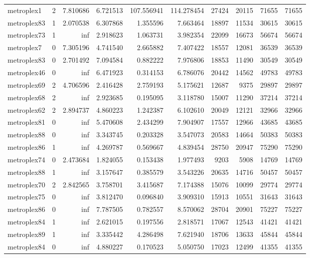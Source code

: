 \begin{longtable}{|l|r|r|r|r|r|r|r|r|r|}
metroplex1 & 2 & 7.810686 & 6.721513 & 107.556941 & 114.278454 & 27424 & 20115 & 71655 & 71655 \\
metroplex83 & 1 & 2.070538 & 6.307868 & 1.355596 & 7.663464 & 18897 & 11534 & 30615 & 30615 \\
metroplex73 & 1 & inf & 2.918623 & 1.063731 & 3.982354 & 22099 & 16673 & 56674 & 56674 \\
metroplex7 & 0 & 7.305196 & 4.741540 & 2.665882 & 7.407422 & 18557 & 12081 & 36539 & 36539 \\
metroplex83 & 0 & 2.701492 & 7.094584 & 0.882222 & 7.976806 & 18853 & 11490 & 30549 & 30549 \\
metroplex46 & 0 & inf & 6.471923 & 0.314153 & 6.786076 & 20442 & 14562 & 49783 & 49783 \\
metroplex69 & 2 & 4.706596 & 2.416428 & 2.759193 & 5.175621 & 12687 & 9375 & 29897 & 29897 \\
metroplex68 & 2 & inf & 2.923685 & 0.195095 & 3.118780 & 15007 & 11290 & 37214 & 37214 \\
metroplex62 & 2 & 2.894737 & 4.860223 & 1.242387 & 6.102610 & 20049 & 12121 & 32966 & 32966 \\
metroplex81 & 0 & inf & 5.470608 & 2.434299 & 7.904907 & 17557 & 12966 & 43685 & 43685 \\
metroplex88 & 0 & inf & 3.343745 & 0.203328 & 3.547073 & 20583 & 14664 & 50383 & 50383 \\
metroplex86 & 1 & inf & 4.269787 & 0.569667 & 4.839454 & 28750 & 20947 & 75290 & 75290 \\
metroplex74 & 0 & 2.473684 & 1.824055 & 0.153438 & 1.977493 & 9203 & 5908 & 14769 & 14769 \\
metroplex88 & 1 & inf & 3.157647 & 0.385579 & 3.543226 & 20635 & 14716 & 50457 & 50457 \\
metroplex70 & 2 & 2.842565 & 3.758701 & 3.415687 & 7.174388 & 15076 & 10099 & 29774 & 29774 \\
metroplex75 & 0 & inf & 3.812470 & 0.096840 & 3.909310 & 15913 & 10551 & 31643 & 31643 \\
metroplex86 & 0 & inf & 7.787505 & 0.782557 & 8.570062 & 28704 & 20901 & 75227 & 75227 \\
metroplex84 & 1 & inf & 2.621015 & 0.197556 & 2.818571 & 17067 & 12543 & 41421 & 41421 \\
metroplex89 & 1 & inf & 3.335442 & 4.286498 & 7.621940 & 18706 & 13633 & 45844 & 45844 \\
metroplex84 & 0 & inf & 4.880227 & 0.170523 & 5.050750 & 17023 & 12499 & 41355 & 41355 \\

\end{longtable}
